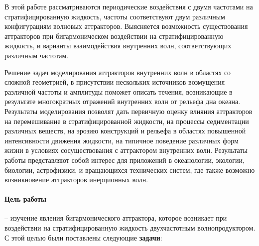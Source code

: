 \documentclass[utf8x]{G7-32} %
\begin{document}
В этой работе рассматриваются периодические воздействия с двумя частотами на стратифицированную жидкость, частоты соответствуют двум различным конфигурациям волновых аттракторов. Выясняется возможность существования аттракторов при бигармоническом воздействии на стратифицированную жидкость, и варианты взаимодействия внутренних волн, соответствующих различным частотам. 

Решение задач моделирования аттракторов внутренних волн в областях со сложной геометрией, в присутствии нескольких источников возмущения различной частоты и амплитуды поможет описать течения, возникающие в результате многократных отражений внутренних волн от рельефа дна океана. Результаты моделирования позволят дать первичную оценку влияния аттракторов на перемешивание в стратифицированной жидкости, на процессы седиментации различных веществ, на эрозию конструкций и рельефа в областях повышенной интенсивности движения жидкости, на типичное поведение различных форм жизни в условиях сосуществования с аттрактором внутренних волн. Результаты работы представляют собой интерес для приложений в океанологии, экологии, биологии, астрофизики, и вращающихся технических систем, где также возможно возникновение аттракторов инерционных волн. 

\paragraph{Цель работы} -- изучение явления бигармонического аттрактора, которое возникает при воздействии на стратифицированную жидкость двухчастотным волнопродуктором.  
С этой целью были поставлены следующие \textbf{задачи}:
\end{document}
